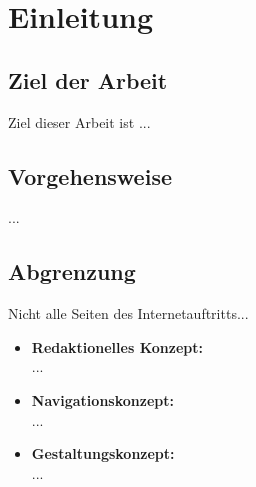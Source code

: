 \section{Einleitung}
\subsection{Ziel der Arbeit}

Ziel dieser Arbeit ist ...

\subsection{Vorgehensweise}

...

\subsection{Abgrenzung}

Nicht alle Seiten des Internetauftritts...

\begin{itemize}
	\item \textbf{Redaktionelles Konzept:}\\
	...
	\item \textbf{Navigationskonzept:}\\
	...
	\item \textbf{Gestaltungskonzept:}\\
	...

\end{itemize}

